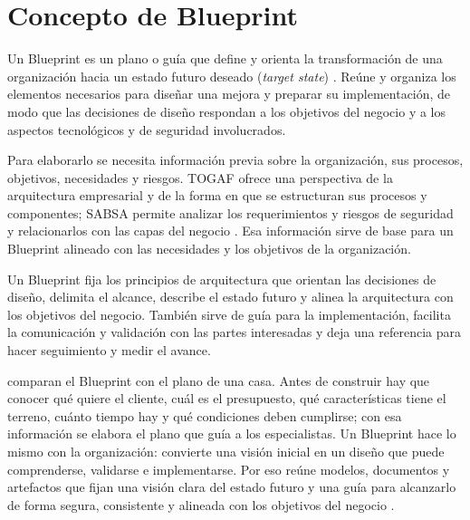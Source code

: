 \section*{Concepto de Blueprint}

Un Blueprint es un plano o guía que define y orienta la transformación de una organización hacia un
estado futuro deseado (\textit{target state}) \parencite{moyle2020practical}. Reúne y organiza los
elementos necesarios para diseñar una mejora y preparar su implementación, de modo que las decisiones
de diseño respondan a los objetivos del negocio y a los aspectos tecnológicos y de seguridad
involucrados.

Para elaborarlo se necesita información previa sobre la organización, sus procesos, objetivos,
necesidades y riesgos. TOGAF ofrece una perspectiva de la arquitectura empresarial y de la forma en que
se estructuran sus procesos y componentes; SABSA permite analizar los requerimientos y riesgos de
seguridad y relacionarlos con las capas del negocio \parencite{moyle2020practical}. Esa información
sirve de base para un Blueprint alineado con las necesidades y los objetivos de la organización.

Un Blueprint fija los principios de arquitectura que orientan las decisiones de diseño, delimita el
alcance, describe el estado futuro y alinea la arquitectura con los objetivos del negocio. También
sirve de guía para la implementación, facilita la comunicación y validación con las partes interesadas
y deja una referencia para hacer seguimiento y medir el avance.

\textcite{moyle2020practical} comparan el Blueprint con el plano de una casa. Antes de
construir hay que conocer qué quiere el cliente, cuál es el presupuesto, qué características tiene el
terreno, cuánto tiempo hay y qué condiciones deben cumplirse; con esa información se elabora el plano
que guía a los especialistas. Un Blueprint hace lo mismo con la organización: convierte una visión
inicial en un diseño que puede comprenderse, validarse e implementarse. Por eso reúne modelos,
documentos y artefactos que fijan una visión clara del estado futuro y una guía para alcanzarlo de
forma segura, consistente y alineada con los objetivos del negocio \parencite{moyle2020practical}.
